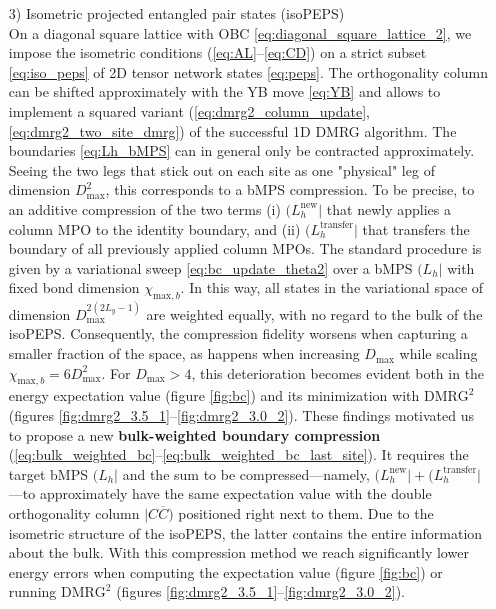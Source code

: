 \begin{enumerate}
	\newpage
	\item[3)] Isometric projected entangled pair states (isoPEPS) \\[0.3em]
	On a diagonal square lattice with OBC \eqref{eq:diagonal_square_lattice_2}, we impose the isometric conditions (\ref{eq:AL}--\ref{eq:CD}) on a strict subset \eqref{eq:iso_peps} of 2D tensor network states \eqref{eq:peps}. The orthogonality column can be shifted approximately with the YB move \eqref{eq:YB} and allows to implement a squared variant (\ref{eq:dmrg2_column_update}, \ref{eq:dmrg2_two_site_dmrg}) of the successful 1D DMRG algorithm. The boundaries \eqref{eq:Lh_bMPS} can in general only be contracted approximately. Seeing the two legs that stick out on each site as one "physical" leg of dimension $D_{\text{max}}^2$, this corresponds to a bMPS compression. To be precise, to an additive compression of the two terms (i) $(L_h^{\text{new}} \vert$ that newly applies a column MPO to the identity boundary, and (ii) $(L_h^{\text{transfer}} \vert$ that transfers the boundary of all previously applied column MPOs. The standard procedure is given by a variational sweep \eqref{eq:bc_update_theta2} over a bMPS $( L_h \vert$ with fixed bond dimension $\chi_{\text{max},b}$. In this way, all states in the variational space of dimension $D_{\text{max}}^{2(2L_y-1)}$ are weighted equally, with no regard to the bulk of the isoPEPS. Consequently, the compression fidelity worsens when capturing a smaller fraction of the space, as happens when increasing $D_{\text{max}}$ while scaling $\chi_{\text{max},b} = 6D_{\text{max}}^2$.
For $D_{\text{max}} > 4$, this deterioration becomes evident both in the energy expectation value (figure \ref{fig:bc}) and its minimization with $\text{DMRG}^2$ (figures \ref{fig:dmrg2_3.5_1}--\ref{fig:dmrg2_3.0_2}). These findings motivated us to propose a new \textbf{bulk-weighted boundary compression} (\ref{eq:bulk_weighted_bc}--\ref{eq:bulk_weighted_bc_last_site}). It requires the target bMPS $( L_h \vert$ and the sum to be compressed---namely, $(L_h^{\text{new}} \vert + (L_h^{\text{transfer}} \vert$---to approximately have the same expectation value with the double orthogonality column $\vert C \overline{C} )$ positioned right next to them. Due to the isometric structure of the isoPEPS, the latter contains the entire information about the bulk. With this compression method we reach significantly lower energy errors when computing the expectation value (figure \ref{fig:bc}) or running $\text{DMRG}^2$ (figures \ref{fig:dmrg2_3.5_1}--\ref{fig:dmrg2_3.0_2}). \\

\end{enumerate}
